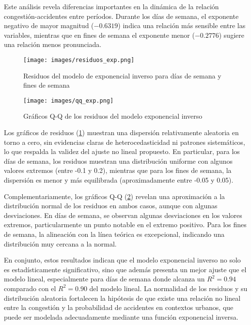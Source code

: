 \documentclass[12pt]{article}
\begin{document}
{Este análisis revela diferencias importantes en la dinámica de la relación congestión-accidentes entre períodos. Durante los días de semana, el exponente negativo de mayor magnitud ($-0.6319$) indica una relación más sensible entre las variables, mientras que en fines de semana el exponente menor ($-0.2776$) sugiere una relación menos pronunciada.

\begin{figure}[H]
\centering
\texttt{[image: images/residuos\_exp.png]}
\caption{Residuos del modelo de exponencial inverso para días de semana y fines de semana}
\label{fig:resid_exp}
\end{figure}

\begin{figure}[H]
\centering
\texttt{[image: images/qq\_exp.png]}
\caption{Gráficos Q-Q de los residuos del modelo exponencial inverso}
\label{fig:qq_exp}
\end{figure}

Los gráficos de residuos (\cref{fig:resid_exp}) muestran una dispersión relativamente aleatoria en torno a cero, sin evidencias claras de heterocedasticidad ni patrones sistemáticos, lo que respalda la validez del ajuste no lineal propuesto. En particular, para los días de semana, los residuos muestran una distribución uniforme con algunos valores extremos (entre -0.1 y 0.2), mientras que para los fines de semana, la dispersión es menor y más equilibrada (aproximadamente entre -0.05 y 0.05).

Complementariamente, los gráficos Q-Q (\cref{fig:qq_exp}) revelan una aproximación a la distribución normal de los residuos en ambos casos, aunque con algunas desviaciones. En días de semana, se observan algunas desviaciones en los valores extremos, particularmente un punto notable en el extremo positivo. Para los fines de semana, la alineación con la línea teórica es excepcional, indicando una distribución muy cercana a la normal.

En conjunto, estos resultados indican que el modelo exponencial inverso no solo es estadísticamente significativo, sino que además presenta un mejor ajuste que el modelo lineal, especialmente para días de semana donde alcanza un $R^2 = 0.94$ comparado con el $R^2 = 0.90$ del modelo lineal. La normalidad de los residuos y su distribución aleatoria fortalecen la hipótesis de que existe una relación no lineal entre la congestión y la probabilidad de accidentes en contextos urbanos, que puede ser modelada adecuadamente mediante una función exponencial inversa.

}
\end{document}
